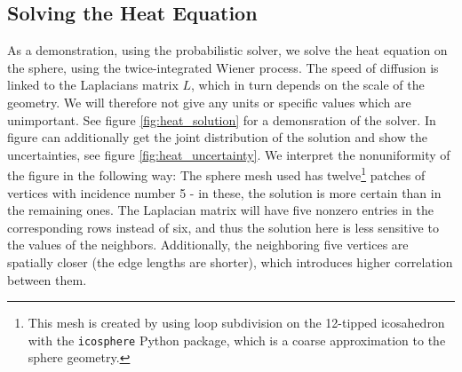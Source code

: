 \subsection*{Solving the Heat Equation}
As a demonstration, using the probabilistic solver, we solve the heat equation on the sphere, using the twice-integrated Wiener process. The speed of diffusion is linked to the Laplacians matrix $L$, which in turn depends on the scale of the geometry. We will therefore not give any units or specific values which are unimportant. See figure \ref{fig:heat_solution} for a demonsration of the solver. In figure can additionally get the joint distribution of the solution and show the uncertainties, see figure \ref{fig:heat_uncertainty}. We interpret the nonuniformity of the figure in the following way: The sphere mesh used has twelve\footnote{This mesh is created by using loop subdivision on the 12-tipped icosahedron with the \texttt{icosphere} Python package, which is a coarse approximation to the sphere geometry.} patches of vertices with incidence number 5 - in these, the solution is more certain than in the remaining ones. The Laplacian matrix will have five nonzero entries in the corresponding rows instead of six, and thus the solution here is less sensitive to the values of the neighbors. Additionally, the neighboring five vertices are spatially closer (the edge lengths are shorter), which introduces higher correlation between them.

